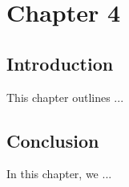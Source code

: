 \chapter{Chapter 4}
\minitoc
\label{chap:4th}
\section*{Introduction}
This chapter outlines ...


\section*{Conclusion}
    In this chapter, we ...